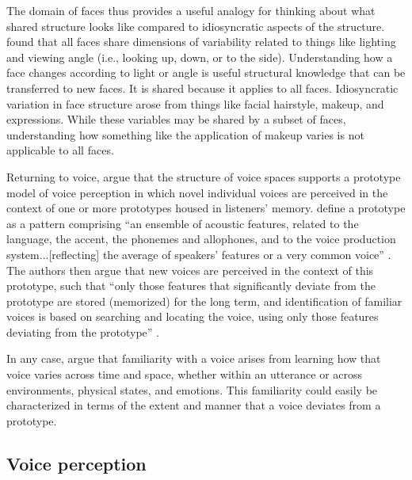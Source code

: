 The domain of faces thus provides a useful analogy for thinking about what shared structure looks like compared to idiosyncratic aspects of the structure. \citet{burton_2016_faces} found that all faces share dimensions of variability related to things like lighting and viewing angle (i.e., looking up, down, or to the side). Understanding how a face changes according to light or angle is useful structural knowledge that can be transferred to new faces. It is shared because it applies to all faces. Idiosyncratic variation in face structure arose from things like facial hairstyle, makeup, and expressions. While these variables may be shared by a subset of faces, understanding how something like the application of makeup varies is not applicable to all faces. 

Returning to voice, \citet{lee_2019_acoustic} argue that the structure of voice spaces supports a prototype model of voice perception \citep{lavner_2001_prototype, latinus_2011_voice} in which novel individual voices are perceived in the context of one or more prototypes housed in listeners' memory. \citeauthor{lavner_2001_prototype} define a prototype as a pattern comprising ``an ensemble of acoustic features, related to the language, the accent, the phonemes and allophones, and to the voice production system...[reflecting] the average of speakers’ features or a very common voice'' \citeyearpar[][p. 64]{lavner_2001_prototype}. The authors then argue that new voices are perceived in the context of this prototype, such that ``only those features that significantly deviate from the prototype are stored (memorized) for the long term, and identification of familiar voices is based on searching and locating the voice, using only those features deviating from the prototype'' \citep[][p. 64]{lavner_2001_prototype}.

In any case, \citet{lee_2019_acoustic} argue that familiarity with a voice arises from learning how that voice varies across time and space, whether within an utterance or across environments, physical states, and emotions. This familiarity could easily be characterized in terms of the extent and manner that a voice deviates from a prototype. 

\subsection{Voice perception}

